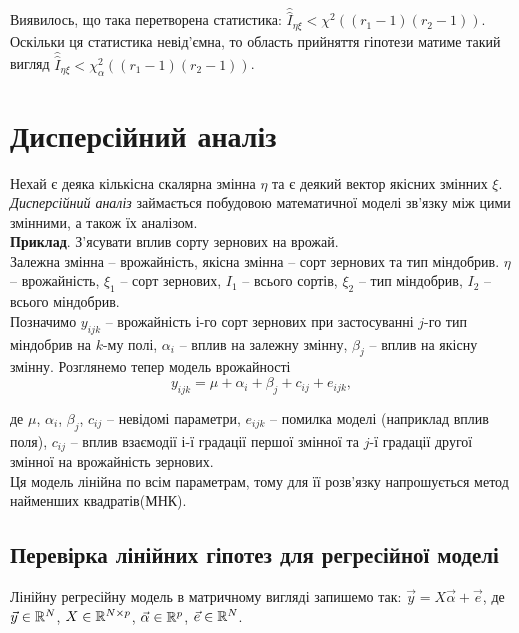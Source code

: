Виявилось, що така перетворена статистика: $\widehat{\widehat{I}}_{\eta\xi} < \chi^2((r_1-1)(r_2-1))$. \\

Оскільки ця статистика невід'ємна, то область прийняття гіпотези матиме такий вигляд $\widehat{\widehat{I}}_{\eta\xi} < \chi^2_\alpha((r_1-1)(r_2-1))$.

\section{Дисперсійний аналіз}

Нехай є деяка кількісна скалярна змінна $\eta$ та є деякий вектор якісних змінних $\xi$. \\

\textit{Дисперсійний аналіз} займається побудовою математичної моделі зв'язку між цими змінними, а також їх аналізом. \\

\textbf{Приклад}. З'ясувати вплив сорту зернових на врожай. \\

Залежна змінна -- врожайність, якісна змінна -- сорт зернових та тип міндобрив. $\eta$ -- врожайність, $\xi_1$ -- сорт зернових, $I_1$ -- всього сортів, $\xi_2$ -- тип міндобрив, $I_2$ -- всього міндобрив. \\

Позначимо $y_{ijk}$ -- врожайність $і$-го сорт зернових при застосуванні $j$-го тип міндобрив на $k$-му полі, $\alpha_i$ -- вплив на залежну змінну, $\beta_j$ -- вплив на якісну змінну. Розглянемо тепер модель врожайності \[y_{ijk}=\mu+\alpha_i+\beta_j+c_{ij}+e_{ijk},\] 

де $\mu$, $\alpha_i$, $\beta_j$, $c_{ij}$ -- невідомі параметри, $e_{ijk}$ -- помилка моделі (наприклад вплив поля), $c_{ij}$ -- вплив взаємодії $і$-ї градації першої змінної та $j$-ї градації другої змінної на врожайність зернових. \\

Ця модель лінійна по всім параметрам, тому для її розв'язку напрошується метод найменших квадратів(МНК).

\subsection{Перевірка лінійних гіпотез для регресійної моделі}

Лінійну регресійну модель в матричному вигляді запишемо так: $\vec y = X \vec \alpha + \vec e$, де $\vec y\in\mathbb{R}^N$, $X\in\mathbb{R}^{N\times p}$, $\vec\alpha\in\mathbb{R}^p$, $\vec e\in\mathbb{R}^N$. \\

